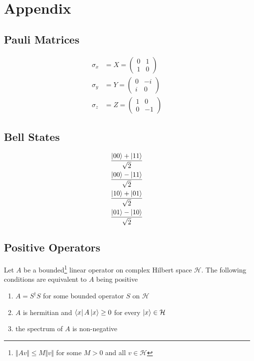 \documentclass[11pt]{article}
\newcommand\0{\mathbf{0}}
\newcommand\<{\langle}
\renewcommand\>{\rangle}
\begin{document}
\section{Appendix}

\subsection{Pauli Matrices}\label{pauli}
\begin{align*}
\sigma_x &= X = \begin{pmatrix} 0 & 1 \\ 1 & 0\end{pmatrix} \\
\sigma_y &= Y = \begin{pmatrix} 0 & -i \\ i & 0\end{pmatrix}\\
\sigma_z &= Z = \begin{pmatrix} 1 & 0 \\ 0 & -1\end{pmatrix}
\end{align*}

\subsection{Bell States}\label{bellstates}
\begin{align*}
\frac{\ket{00} + \ket{11} }{\sqrt{2}} \\	
\frac{\ket{00} - \ket{11} }{\sqrt{2}} \\	
\frac{\ket{10} + \ket{01} }{\sqrt{2}} \\	
\frac{\ket{01} - \ket{10} }{\sqrt{2}}
\end{align*}

\subsection{Positive Operators}\label{posop}
Let $A$ be a bounded\footnote{$\Vert Av \Vert \leq M\Vert v \Vert$ for some $M>0$ and all $v \in \mathcal{H}$} linear operator on complex Hilbert space $\mathcal{H}$. The following conditions are equivalent to $A$ being positive

\begin{enumerate}
\item $A=S^\dag S$ for some bounded operator $S$ on $\mathcal{H}$
\item $A$ is hermitian and $\bra{x} A \ket{x} \geq 0$ for every $\ket{x} \in \mathcal{H}$
\item the spectrum of $A$ is non-negative
\end{enumerate}
\end{document}
